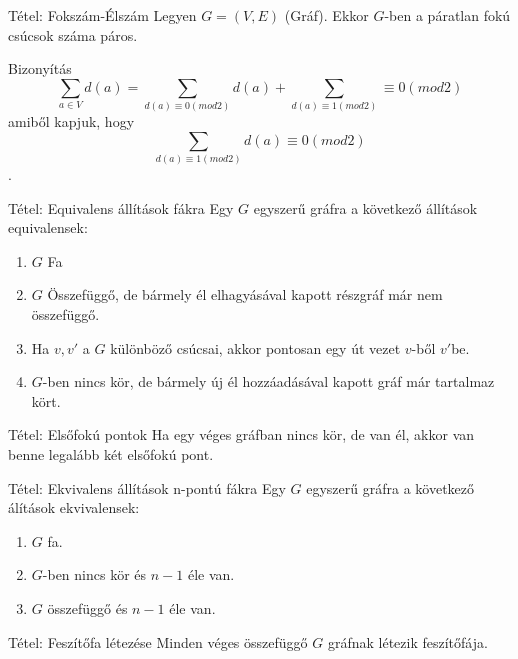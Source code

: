 \documentclass{beamer}
\begin{document}
\begin{frame}

\begin{block}{Tétel: Fokszám-Élszám}
Legyen $G = (V, E)$ (Gráf). Ekkor $G$-ben a páratlan fokú csúcsok száma páros.

\end{block}

\begin{block}{Bizonyítás}
$$\sum_{a \in V} d(a) = \sum_{d(a) \equiv 0 (mod 2)} d(a) + \sum_{d(a) \equiv 1 (mod 2)} \equiv 0 (mod 2)$$
amiből kapjuk, hogy $$\sum_{d(a) \equiv 1 (mod 2)} d(a) \equiv 0 (mod 2)$$.

\end{block}

\end{frame}

\begin{frame}

\begin{block}{Tétel: Equivalens állítások fákra}
Egy $G$ egyszerű gráfra a következő állítások equivalensek:

\begin{enumerate}
\item $G$ Fa
\item $G$ Összefüggő, de bármely él elhagyásával kapott részgráf már nem összefüggő.
\item Ha $v, v'$ a $G$ különböző csúcsai, akkor pontosan egy út vezet $v$-ből $v'$be.
\item $G$-ben nincs kör, de bármely új él hozzáadásával kapott gráf már tartalmaz kört.
\end{enumerate}

\end{block}


\begin{block}{Tétel: Elsőfokú pontok}
Ha egy véges gráfban nincs kör, de van él, akkor van benne legalább két elsőfokú pont.

\end{block}

\end{frame}

\begin{frame} 

\begin{block}{Tétel: Ekvivalens állítások n-pontú fákra}
Egy $G$ egyszerű gráfra a következő álítások ekvivalensek:

\begin{enumerate}
\item $G$ fa.
\item $G$-ben nincs kör és $n - 1$ éle van.
\item $G$ összefüggő és $n - 1$ éle van.
\end{enumerate}

\end{block}

\begin{block}{Tétel: Feszítőfa létezése}
Minden véges összefüggő $G$ gráfnak létezik feszítőfája.

\end{block}

\end{frame}
\end{document}
